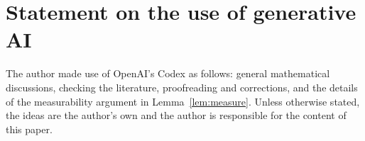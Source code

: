 \documentclass[11pt]{article}
\theoremstyle{plain}
\theoremstyle{definition}
\begin{document}
\section*{Statement on the use of generative AI}
The author made use of OpenAI's Codex as follows: general mathematical discussions,
checking the literature, proofreading and corrections, and the details of the 
measurability argument in Lemma~\ref{lem:measure}.
Unless otherwise stated, the ideas are the author's own and the author is responsible 
for the content of this paper.

\begingroup
\small


\endgroup
\end{document}

